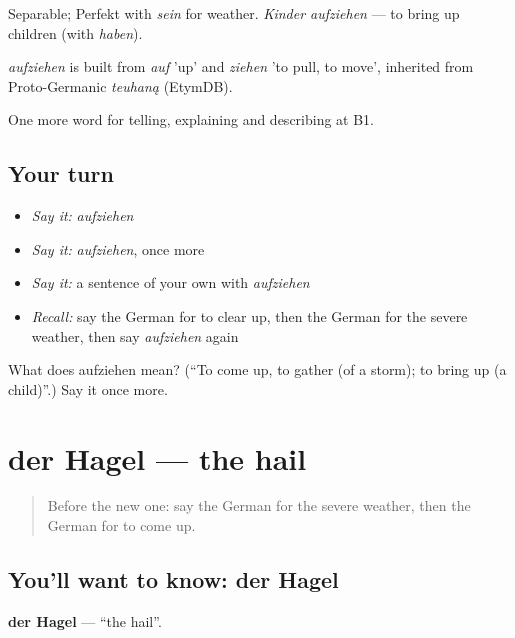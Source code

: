 Separable; Perfekt with \emph{sein} for weather. \emph{Kinder aufziehen} — to bring up children (with \emph{haben}).

\begin{cousinweb}
\emph{aufziehen} is built from \emph{auf} 'up' and \emph{ziehen} 'to pull, to move', inherited from Proto-Germanic \emph{teuhaną} (EtymDB).
\end{cousinweb}

\begin{grammarlens}[title={What you've built}]
One more word for telling, explaining and describing at B1.
\end{grammarlens}

\subsection*{Your turn}
\begin{itemize}
\raggedright
  \item \emph{Say it:} \emph{aufziehen}
  \item \emph{Say it:} \emph{aufziehen}, once more
  \item \emph{Say it:} a sentence of your own with \emph{aufziehen}
  \item \emph{Recall:} say the German for to clear up, then the German for the severe weather, then say \emph{aufziehen} again
\end{itemize}

\begin{tcolorbox}[breakable,colback=teal!4,colframe=teal!35!black,title={Before you move on}]
What does aufziehen mean? (\textquotedblleft{}To come up, to gather (of a storm); to bring up (a child)\textquotedblright{}.) Say it once more.
\end{tcolorbox}
\section[der Hagel]{der Hagel — the hail}

\label{lesson:GE-C462-hagel}



\begin{quote}
Before the new one: say the German for the severe weather, then the German for to come up.
\end{quote}

\subsection*{You'll want to know: der Hagel}
\textbf{der Hagel} — \textquotedblleft{}the hail\textquotedblright{}.

